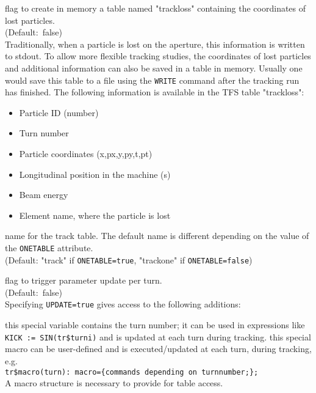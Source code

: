 \begin{madlist}
   flag to create in memory a table named "trackloss"
  containing the coordinates of lost particles.\\
  (Default:~false) \\
  Traditionally, when a particle is lost on the aperture, this information
  is written to stdout. To allow more flexible tracking studies, the
  coordinates of lost particles and additional information can also be
  saved in a table in memory. Usually one would save this table to a
  file using the {\tt WRITE} command after the tracking run has
  finished. The following information is available in the TFS table
  "trackloss":          
  \begin{itemize}
  \item Particle ID (number)
  \item Turn number
  \item Particle coordinates (x,px,y,py,t,pt)
  \item Longitudinal position in the machine (s)
  \item Beam energy
  \item Element name, where the particle is lost
  \end{itemize}

   name for the track table. The default name is different
  depending on the value of the {\tt ONETABLE} attribute. \\ 
  (Default: "track" if {\tt ONETABLE=true}, "trackone" if {\tt ONETABLE=false})

   flag to trigger parameter update per turn. \\  
  (Default:~false) \\
  Specifying {\tt UPDATE=true} gives access to the following additions:   
  \begin{madlist}
   this special variable contains the turn number;
  it can be used in expressions like {\tt KICK := SIN(tr\$turni)} and is
  updated at each turn during tracking.     
    this special macro can be
    user-defined and is executed/updated at each turn, during tracking, e.g. \\
    {\tt tr\$macro(turn): macro=\{commands depending on turnnumber;\};} 
    \\ 
    A macro structure is necessary to provide for table access.
  \end{madlist}


\end{madlist}

